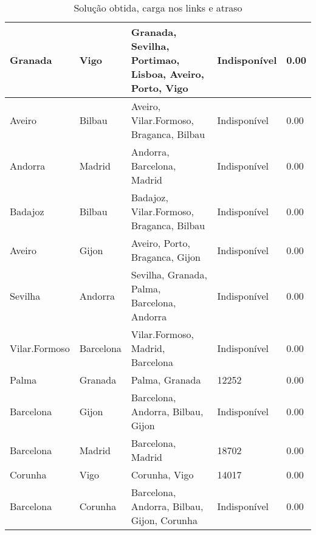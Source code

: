 \begin{table}[!htb]
{\begin{tabular}{|l|l|l|l|l|}
Granada & Vigo & Granada, Sevilha, Portimao, Lisboa, Aveiro, Porto, Vigo & Indisponível & 0.00 \\ \hline
Aveiro & Bilbau & Aveiro, Vilar.Formoso, Braganca, Bilbau & Indisponível & 0.00 \\ \hline
Andorra & Madrid & Andorra, Barcelona, Madrid & Indisponível & 0.00 \\ \hline
Badajoz & Bilbau & Badajoz, Vilar.Formoso, Braganca, Bilbau & Indisponível & 0.00 \\ \hline
Aveiro & Gijon & Aveiro, Porto, Braganca, Gijon & Indisponível & 0.00 \\ \hline
Sevilha & Andorra & Sevilha, Granada, Palma, Barcelona, Andorra & Indisponível & 0.00 \\ \hline
Vilar.Formoso & Barcelona & Vilar.Formoso, Madrid, Barcelona & Indisponível & 0.00 \\ \hline
Palma & Granada & Palma, Granada & 12252 & 0.00 \\ \hline
Barcelona & Gijon & Barcelona, Andorra, Bilbau, Gijon & Indisponível & 0.00 \\ \hline
Barcelona & Madrid & Barcelona, Madrid & 18702 & 0.00 \\ \hline
Corunha & Vigo & Corunha, Vigo & 14017 & 0.00 \\ \hline
Barcelona & Corunha & Barcelona, Andorra, Bilbau, Gijon, Corunha & Indisponível & 0.00 \\ \hline
\end{tabular}}
\caption[]{Solução obtida, carga nos links e atraso}
\end{table}

